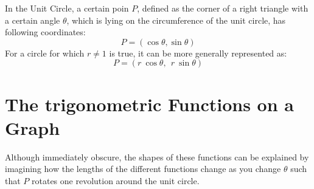 \documentclass[a4paper, 12pt]{article}
\begin{document}
\bigbreak
In the Unit Circle, a certain poin $P$, defined as the corner of a right triangle with a certain angle $\theta$, which is lying on the circumference of the unit circle, has following coordinates:
$$P = (\cos \theta, \sin \theta)$$ \bigbreak
For a circle for which $r \neq 1$ is true, it can be more generally represented as:
$$P = (r \ \cos \theta, \ \ r \ \sin \theta)$$

\newpage

\section{The trigonometric Functions on a Graph}


 \bigbreak


Although immediately obscure, the shapes of these 
functions can be explained by imagining how the lengths 
of the different functions change as you change $\theta$ 
such that $P$ rotates one revolution around the unit 
circle.
\end{document}
